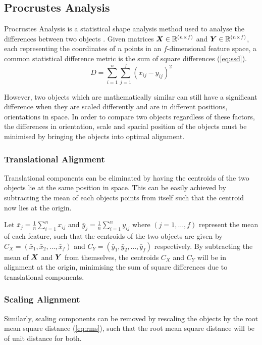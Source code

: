 \documentclass[12pt]{report}
\begin{document}
\subsection{Procrustes Analysis} \label{sec:procrustes_analysis}
Procrustes Analysis is a statistical shape analysis method used to analyse the differences between two objects \cite{Krzanowski2000}.
Given matrices ${\boldsymbol{{X}}} \in \mathbb{R}^{(n\times f)}$ and ${\boldsymbol{{Y}}} \in \mathbb{R}^{(n\times f)}$, each representing the coordinates of $n$ points in an $f$-dimensional feature space, a common statistical difference metric is the sum of square differences (\ref{eq:ssd}).
\begin{equation}
    \label{eq:ssd}
    D = \sum_{i=1}^{n} \sum_{j=1}^{f} (x_{ij} - y_{ij})^2
\end{equation}

However, two objects which are mathematically similar can still have a significant difference when they are scaled differently and are in different positions, orientations in space.
In order to compare two objects regardless of these factors, the differences in orientation, scale and spacial position of the objects must be minimised by bringing the objects into optimal alignment.

\subsubsection{Translational Alignment} \label{sec:trans_align}
Translational components can be eliminated by having the centroids of the two objects lie at the same position in space.
This can be easily achieved by subtracting the mean of each objects points from itself such that the centroid now lies at the origin.

Let $\bar{x}_j = \frac{1}{n} \sum_{i=1}^{n} x_{ij}$ and $\bar{y}_j = \frac{1}{n} \sum_{i=1}^{n} y_{ij}$ where $(j = 1, \dots, f)$ represent the mean of each feature, such that the centroids of the two objects are given by $C_X = (\bar{x}_1, \bar{x}_2, \dots, \bar{x}_f)$ and $C_Y = (\bar{y}_1, \bar{y}_2, \dots, \bar{y}_f)$ respectively.
By subtracting the mean of ${\boldsymbol{{X}}}$ and ${\boldsymbol{{Y}}}$ from themselves, the centroids $C_X$ and $C_Y$ will be in alignment at the origin, minimising the sum of square differences due to translational components.

\subsubsection{Scaling Alignment} \label{sec:scale_align}
Similarly, scaling components can be removed by rescaling the objects by the root mean square distance (\ref{eq:rms}), such that the root mean square distance will be of unit distance for both.
\end{document}
